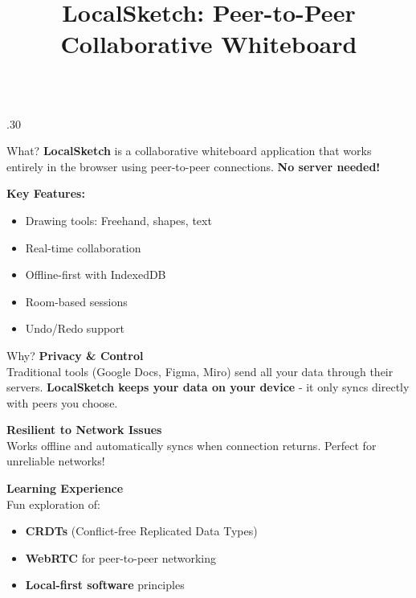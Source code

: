 \documentclass[final,t]{beamer}
\title{\LARGE LocalSketch: Peer-to-Peer Collaborative Whiteboard}
\begin{document}
\begin{frame}[t]
\begin{columns}[t]

\begin{column}{.30\linewidth}

\begin{block}{What?}
\textbf{LocalSketch} is a collaborative whiteboard application that works entirely in the browser using peer-to-peer connections. \textbf{No server needed!}

\vspace{0.5cm}
\textbf{Key Features:}
\begin{itemize}
    \item Drawing tools: Freehand, shapes, text
    \item Real-time collaboration
    \item Offline-first with IndexedDB
    \item Room-based sessions
    \item Undo/Redo support
\end{itemize}
\end{block}

\vspace{0.5cm}

\begin{block}{Why?}
\textbf{Privacy \& Control}\\
Traditional tools (Google Docs, Figma, Miro) send all your data through their servers. \textbf{LocalSketch keeps your data on your device} - it only syncs directly with peers you choose.

\vspace{0.5cm}
\textbf{Resilient to Network Issues}\\
Works offline and automatically syncs when connection returns. Perfect for unreliable networks!

\vspace{0.5cm}
\textbf{Learning Experience}\\
Fun exploration of:
\begin{itemize}
    \item \textbf{CRDTs} (Conflict-free Replicated Data Types)
    \item \textbf{WebRTC} for peer-to-peer networking
    \item \textbf{Local-first software} principles
\end{itemize}
\end{block}

\vspace{0.5cm}


\end{column}
\end{columns}
\end{frame}
\end{document}
